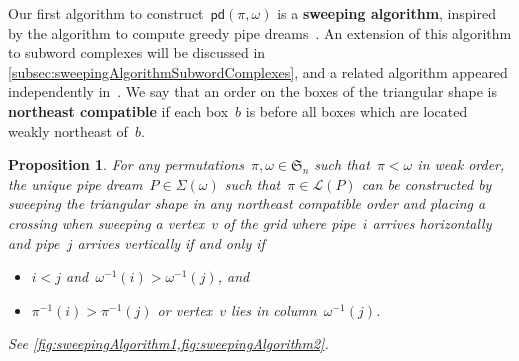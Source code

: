 \documentclass[reqno]{amsart}
\newtheorem{proposition}[theorem]{Proposition}
\theoremstyle{definition}
\newcommand{\defn}[1]{\textbf{\textsf{\color{PineGreen} #1}}} %
\newcommand{\fS}{\mathfrak{S}} %
\newcommand{\acyclicPipeDreams}{\Sigma} %
\newcommand{\linearExtensions}{\mathcal{L}} %
\newcommand{\insertion}[2]{\mathsf{pd}(#1,#2)} %
\begin{document}
Our first algorithm to construct~$\insertion{\pi}{\omega}$ is a \defn{sweeping algorithm}, inspired by the algorithm to compute greedy pipe dreams~\cite{PilaudPocchiola, PilaudStump-ELlabelings}.
An extension of this algorithm to subword complexes will be discussed in \cref{subsec:sweepingAlgorithmSubwordComplexes}, and a related algorithm appeared independently in~\cite{JahnStump}.
We say that an order on the boxes of the triangular shape is \defn{northeast compatible} if each box~$b$ is before all boxes which are located weakly northeast of~$b$.

\begin{proposition}
\label{prop:sweepingAlgorithm}
For any permutations~$\pi,\omega \in \fS_n$ such that~$\pi < \omega$ in weak order, the unique pipe dream~$P \in \acyclicPipeDreams(\omega)$ such that~$\pi \in \linearExtensions(P)$ can be constructed by sweeping the triangular shape in any northeast compatible order and placing a crossing when sweeping a vertex~$v$ of the grid where pipe~$i$ arrives horizontally and pipe~$j$ arrives vertically if and only if
\begin{itemize}
\item $i < j$ and~$\omega^{-1}(i) > \omega^{-1}(j)$, and 
\item $\pi^{-1}(i) > \pi^{-1}(j)$ or vertex~$v$ lies in column~$\omega^{-1}(j)$.
\end{itemize}
See \cref{fig:sweepingAlgorithm1,fig:sweepingAlgorithm2}.
\end{proposition}
\end{document}
